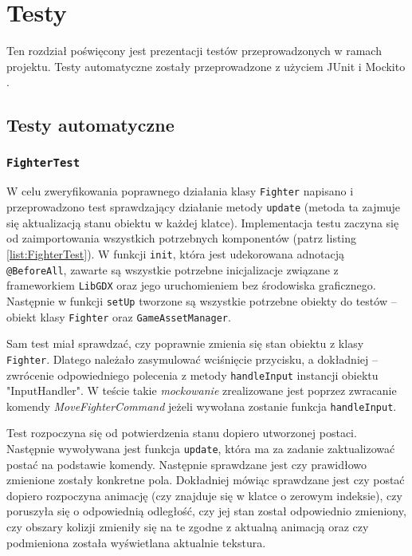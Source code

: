 \chapter{Testy}
Ten rozdział poświęcony jest prezentacji testów przeprowadzonych w ramach projektu. Testy automatyczne zostały przeprowadzone z użyciem JUnit \cite{JUnit} i Mockito \cite{Mockito}.

\section{Testy automatyczne}
\subsection{\texttt{FighterTest}}
W celu zweryfikowania poprawnego działania klasy \texttt{Fighter} napisano i przeprowadzono test sprawdzający działanie metody \texttt{update} (metoda ta zajmuje się aktualizacją stanu obiektu w każdej klatce). Implementacja testu zaczyna się od zaimportowania wszystkich potrzebnych komponentów (patrz listing \ref{list:FighterTest}). W funkcji \texttt{init}, która jest udekorowana adnotacją \texttt{@BeforeAll}, zawarte są wszystkie potrzebne inicjalizacje związane z frameworkiem \texttt{LibGDX} oraz jego uruchomieniem bez środowiska graficznego. Następnie w funkcji \texttt{setUp} tworzone są wszystkie potrzebne obiekty do testów -- obiekt klasy \texttt{Fighter} oraz \texttt{GameAssetManager}. 

Sam test miał sprawdzać, czy poprawnie zmienia się stan obiektu z klasy \texttt{Fighter}. Dlatego należało zasymulować wciśnięcie przycisku, a dokładniej -- zwrócenie odpowiedniego polecenia z metody \texttt{handleInput} instancji obiektu "InputHandler". W teście takie \emph{mockowanie} zrealizowane jest poprzez zwracanie komendy \emph{MoveFighterCommand} jeżeli wywołana zostanie funkcja \texttt{handleInput}.

Test rozpoczyna się od potwierdzenia stanu dopiero utworzonej postaci. Następnie wywoływana jest funkcja \texttt{update}, która ma za zadanie zaktualizować postać na podstawie komendy. Następnie sprawdzane jest czy prawidłowo zmienione zostały konkretne pola. Dokładniej mówiąc sprawdzane jest czy postać dopiero rozpoczyna animację (czy znajduje się w klatce o zerowym indeksie), czy poruszyła się o odpowiednią odległość, czy jej stan został odpowiednio zmieniony, czy obszary kolizji zmieniły się na te zgodne z aktualną animacją oraz czy podmieniona została wyświetlana aktualnie tekstura. 

